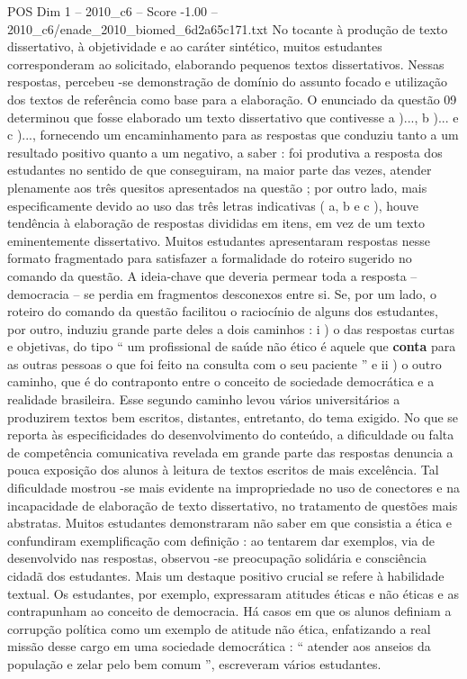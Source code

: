 \begin{textsample}{POS Dim 1 – 2010\_c6 – Score -1.00 – 2010\_c6/enade\_2010\_biomed\_6d2a65c171.txt}
No tocante à produção de texto dissertativo, à objetividade e ao caráter sintético, muitos estudantes corresponderam ao solicitado, elaborando pequenos textos dissertativos.
Nessas respostas, percebeu -se demonstração de domínio do assunto focado e utilização dos textos de referência como base para a elaboração.
O enunciado da questão 09 determinou que fosse elaborado um texto dissertativo que contivesse a )..., b )... e c )..., fornecendo um encaminhamento para as respostas que conduziu tanto a um resultado positivo quanto a um negativo, a saber : foi produtiva a resposta dos estudantes no sentido de que conseguiram, na maior parte das vezes, atender plenamente aos três quesitos apresentados na questão ; por outro lado, mais especificamente devido ao uso das três letras indicativas ( a, b e c ), houve tendência à elaboração de respostas divididas em itens, em vez de um texto eminentemente dissertativo.
Muitos estudantes apresentaram respostas nesse formato fragmentado para satisfazer a formalidade do roteiro sugerido no comando da questão.
A ideia-chave que deveria permear toda a resposta – democracia – se perdia em fragmentos desconexos entre si.
Se, por um lado, o roteiro do comando da questão facilitou o raciocínio de alguns dos estudantes, por outro, induziu grande parte deles a dois caminhos : i ) o das respostas curtas e objetivas, do tipo “ um profissional de saúde não ético é aquele que \textbf{conta} para as outras pessoas o que foi feito na consulta com o seu paciente ” e ii ) o outro caminho, que é do contraponto entre o conceito de sociedade democrática e a realidade brasileira.
Esse segundo caminho levou vários universitários a produzirem textos bem escritos, distantes, entretanto, do tema exigido.
No que se reporta às especificidades do desenvolvimento do conteúdo, a dificuldade ou falta de competência comunicativa revelada em grande parte das respostas denuncia a pouca exposição dos alunos à leitura de textos escritos de mais excelência.
Tal dificuldade mostrou -se mais evidente na impropriedade no uso de conectores e na incapacidade de elaboração de texto dissertativo, no tratamento de questões mais abstratas.
Muitos estudantes demonstraram não saber em que consistia a ética e confundiram exemplificação com definição : ao tentarem dar exemplos, via de desenvolvido nas respostas, observou -se preocupação solidária e consciência cidadã dos estudantes.
Mais um destaque positivo crucial se refere à habilidade textual.
Os estudantes, por exemplo, expressaram atitudes éticas e não éticas e as contrapunham ao conceito de democracia.
Há casos em que os alunos definiam a corrupção política como um exemplo de atitude não ética, enfatizando a real missão desse cargo em uma sociedade democrática : “ atender aos anseios da população e zelar pelo bem comum ”, escreveram vários estudantes.

\end{textsample}
